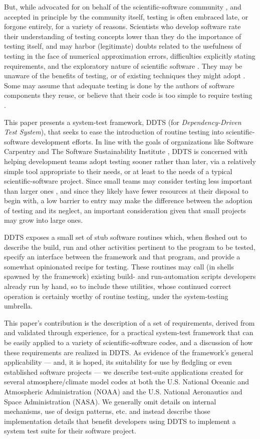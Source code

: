 \documentclass[conference]{IEEEtran}
\begin{document}
But, while advocated for on behalf of the scientific-software community \cite{bp4sc}, and accepted in principle by the community itself, testing is often embraced late, or forgone entirely, for a variety of reasons. Scientists who develop software rate their understanding of testing concepts lower than they do the importance of testing itself, and may harbor (legitimate) doubts related to the usefulness of testing in the face of numerical approximation errors, difficulties explicitly stating requirements, and the exploratory nature of scientific software \cite{how-do}. They may be unaware of the benefits of testing, or of existing techniques they might adopt \cite{bottleneck}. Some may assume that adequate testing is done by the authors of software components they reuse, or believe that their code is too simple to require testing \cite{comp-sci-survey}.

This paper presents a system-test framework, DDTS (for \emph{Dependency-Driven Test System}), that seeks to ease the introduction of routine testing into scientific-software development efforts. In line with the goals of organizations like Software Carpentry \cite{sw-carp} and The Software Sustainability Institute \cite{ssi}, DDTS is concerned with helping development teams adopt testing sooner rather than later, via a relatively simple tool appropriate to their needs, or at least to the needs of a typical scientific-software project. Since small teams may consider testing less important than larger ones \cite{how-do}, and since they likely have fewer resources at their disposal to begin with, a low barrier to entry may make the difference between the adoption of testing and its neglect, an important consideration given that small projects may grow into large ones.

DDTS exposes a small set of stub software routines which, when fleshed out to describe the build, run and other activities pertinent to the program to be tested, specify an interface between the framework and that program, and provide a somewhat opinionated recipe for testing. These routines may call (in shells spawned by the framework) existing build- and run-automation scripts developers already run by hand, so to include these utilities, whose continued correct operation is certainly worthy of routine testing, under the system-testing umbrella.

This paper's contribution is the description of a set of requirements, derived from and validated through experience, for a practical system-test framework that can be easily applied to a variety of scientific-software codes, and a discussion of how these requirements are realized in DDTS. As evidence of the framework's general applicability --- and, it is hoped, its suitability for use by fledgling or even established software projects --- we describe test-suite applications created for several atmosphere/climate model codes at both the U.S. National Oceanic and Atmospheric Administration (NOAA) and the U.S. National Aeronautics and Space Administration (NASA). We generally omit details on internal mechanisms, use of design patterns, etc. and instead describe those implementation details that benefit developers using DDTS to implement a system test suite for their software project.
\end{document}
